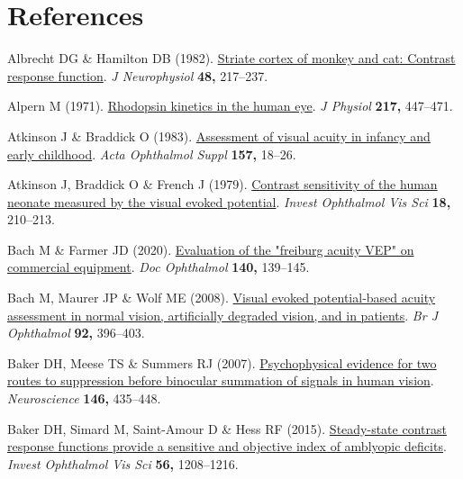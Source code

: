 \documentclass[
  letterpaper,
  DIV=11,
  numbers=noendperiod]{scrartcl}
\newlength{\cslhangindent}
\newenvironment{CSLReferences}[2] %
 {\begin{list}{}{%
  \setlength{\itemindent}{0pt}
  \setlength{\leftmargin}{0pt}
  \setlength{\parsep}{0pt}
  \ifodd #1
   \setlength{\leftmargin}{\cslhangindent}
   \setlength{\itemindent}{-1\cslhangindent}
  \fi
  \setlength{\itemsep}{#2\baselineskip}}}
 {\end{list}}
\begin{document}
\section*{References}\label{references}

\label{refs}
\begin{CSLReferences}{1}{1}
Albrecht DG \& Hamilton DB (1982).
\href{https://doi.org/10.1152/jn.1982.48.1.217}{Striate cortex of monkey
and cat: Contrast response function}. \emph{J Neurophysiol} \textbf{48,}
217--237.

Alpern M (1971).
\href{https://doi.org/10.1113/jphysiol.1971.sp009580}{Rhodopsin kinetics
in the human eye}. \emph{J Physiol} \textbf{217,} 447--471.

Atkinson J \& Braddick O (1983).
\href{https://doi.org/10.1111/j.1755-3768.1983.tb03927.x}{Assessment of
visual acuity in infancy and early childhood}. \emph{Acta Ophthalmol
Suppl} \textbf{157,} 18--26.

Atkinson J, Braddick O \& French J (1979).
\href{https://www.ncbi.nlm.nih.gov/pubmed/761974}{Contrast sensitivity
of the human neonate measured by the visual evoked potential}.
\emph{Invest Ophthalmol Vis Sci} \textbf{18,} 210--213.

Bach M \& Farmer JD (2020).
\href{https://doi.org/10.1007/s10633-019-09726-2}{Evaluation of the
"freiburg acuity VEP" on commercial equipment}. \emph{Doc Ophthalmol}
\textbf{140,} 139--145.

Bach M, Maurer JP \& Wolf ME (2008).
\href{https://doi.org/10.1136/bjo.2007.130245}{Visual evoked
potential-based acuity assessment in normal vision, artificially
degraded vision, and in patients}. \emph{Br J Ophthalmol} \textbf{92,}
396--403.

Baker DH, Meese TS \& Summers RJ (2007).
\href{https://doi.org/10.1016/j.neuroscience.2007.01.030}{Psychophysical
evidence for two routes to suppression before binocular summation of
signals in human vision}. \emph{Neuroscience} \textbf{146,} 435--448.

Baker DH, Simard M, Saint-Amour D \& Hess RF (2015).
\href{https://doi.org/10.1167/iovs.14-15611}{Steady-state contrast
response functions provide a sensitive and objective index of amblyopic
deficits}. \emph{Invest Ophthalmol Vis Sci} \textbf{56,} 1208--1216.


\end{CSLReferences}
\end{document}
